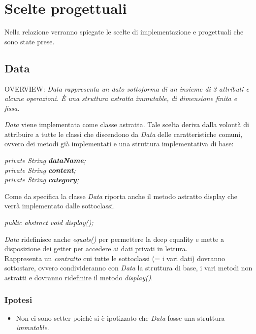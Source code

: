 \documentclass[10pt, a4paper]{article}
\begin{document}
\clearpage

\section{Scelte progettuali}
Nella relazione verranno spiegate le scelte di implementazione e progettuali che sono state prese.

\subsection{Data}
\begin{center}
OVERVIEW: \textit{Data rappresenta un dato sottoforma di un insieme di 3 attributi e alcune operazioni. È una struttura astratta immutable, di dimensione finita e fissa.}
\end{center}
\textit{Data} viene implementata come classe astratta.
Tale scelta deriva dalla volontà di attribuire a tutte le classi che discendono da \textit{Data} delle caratteristiche comuni, ovvero dei metodi già implementati e una struttura implementativa di base:
\begin{center}
	\textit{private String \textbf{dataName};\\
	private String \textbf{content};\\
	private String \textbf{category};\\}
\end{center}
Come da specifica la classe \textit{Data} riporta anche il metodo astratto display che verrà implementato dalle sottoclassi.
\begin{center}
	\textit{public abstract void display();}
\end{center}
\textit{Data} ridefinisce anche \textit{equals()} per permettere la deep equality e mette a disposizione dei getter per accedere ai dati privati in lettura.\\
Rappresenta un \textit{contratto} cui tutte le sottoclassi (= i vari dati) dovranno sottostare, ovvero condivideranno con \textit{Data} la struttura di base, i vari metodi non astratti e dovranno ridefinire il metodo \textit{display()}.
\subsubsection{Ipotesi}
\begin{itemize}
 \item Non ci sono setter poichè si è ipotizzato che \textit{Data} fosse una struttura \textit{immutable}.
 \end{itemize}
 
\end{document}
